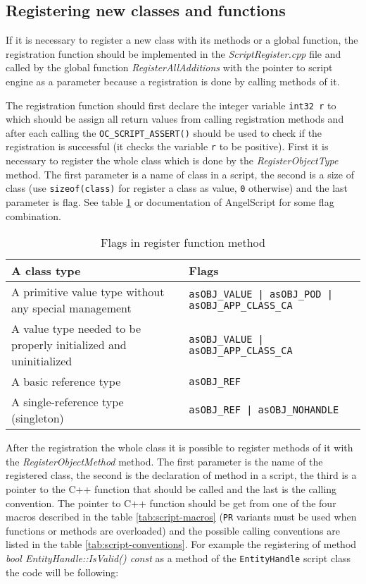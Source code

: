 \subsection{Registering new classes and functions}
\label{sub:script-registering}

If it is necessary to register a new class with its methods or a global function, the registration function should be implemented in the \emph{ScriptRegister.cpp} file and called by the global function \emph{RegisterAllAdditions} with the pointer to script engine as a parameter because a registration is done by calling methods of it.

The registration function should first declare the integer variable \verb/int32 r/ to which should be assign all return values from calling registration methods and after each calling the \verb/OC_SCRIPT_ASSERT()/ should be used to check if the registration is successful (it checks the variable \verb/r/ to be positive). First it is necessary to register the whole class which is done by the \emph{RegisterObjectType} method. The first parameter is a name of class in a script, the second is a size of class (use \verb/sizeof(class)/ for register a class as value, \verb/0/ otherwise) and the last parameter is flag. See table \ref{tab:script-objecttype} or documentation of AngelScript \cite{angelscript} for some flag combination.

\begin{table}[htbp]
	\centering
		{\scriptsize
		\begin{tabular}{|p{0.43\hsize}|p{0.50\hsize}|}
		\hline
		A class type & Flags\\
		\hline
		A primitive value type without any special management & \verb/asOBJ_VALUE | asOBJ_POD | asOBJ_APP_CLASS_CA/\\
		A value type needed to be properly initialized and uninitialized & \verb/asOBJ_VALUE | asOBJ_APP_CLASS_CA/\\
		A basic reference type & \verb/asOBJ_REF/\\
		A single-reference type (singleton) & \verb/asOBJ_REF | asOBJ_NOHANDLE/\\
		\hline
		\end{tabular}
		}
	\caption{Flags in register function method}
	\label{tab:script-objecttype}
\end{table}

After the registration the whole class it is possible to register methods of it with the \emph{RegisterObjectMethod} method. The first parameter is the name of the registered class, the second is the declaration of method in a script, the third is a pointer to the C++ function that should be called and the last is the calling convention. The pointer to C++ function should be get from one of the four macros described in the table \ref{tab:script-macros} (\verb/PR/ variants must be used when functions or methods are overloaded) and the possible calling conventions are listed in the table \ref{tab:script-conventions}. For example the registering of method \emph{bool EntityHandle::IsValid() const} as a method of the \verb/EntityHandle/ script class the code will be following:

